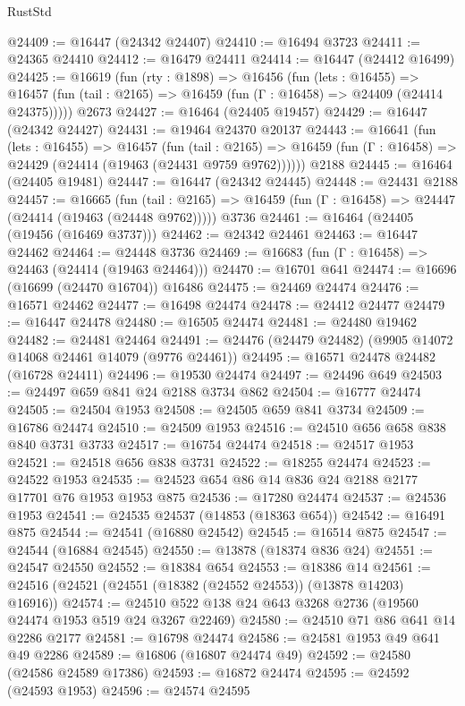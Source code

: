 \begin{lexlean}{RustStd}
\begin{coremodule}
@24409 := @16447 (@24342 @24407)
@24410 := @16494 @3723
@24411 := @24365 @24410
@24412 := @16479 @24411
@24414 := @16447 (@24412 @16499)
@24425 := @16619
    (fun (rty : @1898) =>
    @16456
      (fun (lets : @16455) =>
      @16457 (fun (tail : @2165) => @16459 (fun (Γ : @16458) => @24409 (@24414 @24375)))))
    @2673
@24427 := @16464 (@24405 @19457)
@24429 := @16447 (@24342 @24427)
@24431 := @19464 @24370 @20137
@24443 := @16641
    (fun (lets : @16455) =>
    @16457
      (fun (tail : @2165) =>
      @16459 (fun (Γ : @16458) => @24429 (@24414 (@19463 (@24431 @9759 @9762))))))
    @2188
@24445 := @16464 (@24405 @19481)
@24447 := @16447 (@24342 @24445)
@24448 := @24431 @2188
@24457 := @16665
    (fun (tail : @2165) => @16459 (fun (Γ : @16458) => @24447 (@24414 (@19463 (@24448 @9762)))))
    @3736
@24461 := @16464 (@24405 (@19456 (@16469 @3737)))
@24462 := @24342 @24461
@24463 := @16447 @24462
@24464 := @24448 @3736
@24469 := @16683 (fun (Γ : @16458) => @24463 (@24414 (@19463 @24464)))
@24470 := @16701 @641
@24474 := @16696 (@16699 (@24470 @16704)) @16486
@24475 := @24469 @24474
@24476 := @16571 @24462
@24477 := @16498 @24474
@24478 := @24412 @24477
@24479 := @16447 @24478
@24480 := @16505 @24474
@24481 := @24480 @19462
@24482 := @24481 @24464
@24491 := @24476 (@24479 @24482) (@9905 @14072 @14068 @24461 @14079 (@9776 @24461))
@24495 := @16571 @24478 @24482 (@16728 @24411)
@24496 := @19530 @24474
@24497 := @24496 @649
@24503 := @24497 @659 @841 @24 @2188 @3734 @862
@24504 := @16777 @24474
@24505 := @24504 @1953
@24508 := @24505 @659 @841 @3734
@24509 := @16786 @24474
@24510 := @24509 @1953
@24516 := @24510 @656 @658 @838 @840 @3731 @3733
@24517 := @16754 @24474
@24518 := @24517 @1953
@24521 := @24518 @656 @838 @3731
@24522 := @18255 @24474
@24523 := @24522 @1953
@24535 := @24523 @654 @86 @14 @836 @24 @2188 @2177 @17701 @76 @1953 @1953 @875
@24536 := @17280 @24474
@24537 := @24536 @1953
@24541 := @24535 @24537 (@14853 (@18363 @654))
@24542 := @16491 @875
@24544 := @24541 (@16880 @24542)
@24545 := @16514 @875
@24547 := @24544 (@16884 @24545)
@24550 := @13878 (@18374 @836 @24)
@24551 := @24547 @24550
@24552 := @18384 @654
@24553 := @18386 @14
@24561 := @24516 (@24521 (@24551 (@18382 (@24552 @24553)) (@13878 @14203) @16916))
@24574 := @24510 @522 @138 @24 @643 @3268 @2736 (@19560 @24474 @1953 @519 @24 @3267 @22469)
@24580 := @24510 @71 @86 @641 @14 @2286 @2177
@24581 := @16798 @24474
@24586 := @24581 @1953 @49 @641 @49 @2286
@24589 := @16806 (@16807 @24474 @49)
@24592 := @24580 (@24586 @24589 @17386)
@24593 := @16872 @24474
@24595 := @24592 (@24593 @1953)
@24596 := @24574 @24595

\end{coremodule}
\end{lexlean}
